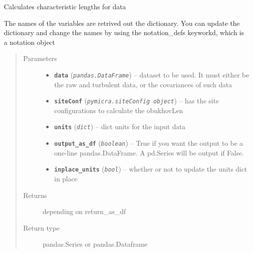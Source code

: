 \documentclass[a4paper,10pt,oneside]{sphinxmanual}
\begin{document}
\begin{fulllineitems}
\label{pymicra.micro:pymicra.micro.scales.turbulentScales}
Calculates characteristic lengths for data

The names of the variables are retrived out the dictionary. You can update the dictionary
and change the names by using the notation\_defs keyworkd, which is a notation object
\begin{quote}\begin{description}
\item[{Parameters}] \leavevmode\begin{itemize}
\item {} 
\textbf{\texttt{data}} (\emph{\texttt{pandas.DataFrame}}) -- dataset to be used. It must either be the raw and turbulent data, or the covariances of such data

\item {} 
\textbf{\texttt{siteConf}} (\emph{\texttt{pymicra.siteConfig object}}) -- has the site configurations to calculate the obukhovLen

\item {} 
\textbf{\texttt{units}} (\emph{\texttt{dict}}) -- dict units for the input data

\item {} 
\textbf{\texttt{output\_as\_df}} (\emph{\texttt{boolean}}) -- True if you want the output to be a one-line pandas.DataFrame. A pd.Series
will be output if False.

\item {} 
\textbf{\texttt{inplace\_units}} (\emph{\texttt{bool}}) -- whether or not to update the units dict in place

\end{itemize}

\item[{Returns}] \leavevmode
depending on return\_as\_df

\item[{Return type}] \leavevmode
pandas.Series or pandas.Dataframe

\end{description}\end{quote}

\end{fulllineitems}
\end{document}
